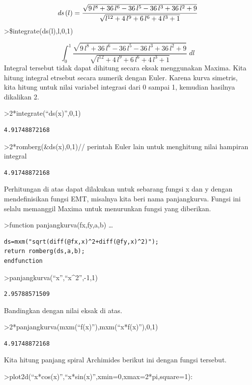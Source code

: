 \documentclass[
]{book}
\begin{document}
\[{\it ds}\left(l\right)=\frac{\sqrt{9\,l^8+36\,l^6-36\,l^5-36\,l^3+  36\,l^2+9}}{\sqrt{l^{12}+4\,l^9+6\,l^6+4\,l^3+1}}\]\textgreater\$integrate(ds(l),l,0,1)

\[\int_{0}^{1}{\frac{\sqrt{9\,l^8+36\,l^6-36\,l^5-36\,l^3+36\,l^2+9}  }{\sqrt{l^{12}+4\,l^9+6\,l^6+4\,l^3+1}}\;dl}\]Integral tersebut tidak dapat dihitung secara eksak menggunakan Maxima. Kita hitung integral etrsebut secara numerik dengan Euler. Karena kurva simetris, kita hitung untuk nilai variabel integrasi dari 0 sampai 1, kemudian hasilnya dikalikan 2.

\textgreater2*integrate(``ds(x)'',0,1)

\begin{verbatim}
4.91748872168
\end{verbatim}

\textgreater2*romberg(\&ds(x),0,1)// perintah Euler lain untuk menghitung nilai hampiran integral

\begin{verbatim}
4.91748872168
\end{verbatim}

Perhitungan di atas dapat dilakukan untuk sebarang fungsi x dan y dengan mendefinisikan fungsi EMT, misalnya kita beri nama panjangkurva. Fungsi ini selalu memanggil Maxima untuk menurunkan fungsi yang diberikan.

\textgreater function panjangkurva(fx,fy,a,b) \ldots{}

\begin{verbatim}
ds=mxm("sqrt(diff(@fx,x)^2+diff(@fy,x)^2)");
return romberg(ds,a,b);
endfunction
\end{verbatim}

\textgreater panjangkurva(``x'',``x\^{}2'',-1,1)

\begin{verbatim}
2.95788571509
\end{verbatim}

Bandingkan dengan nilai eksak di atas.

\textgreater2*panjangkurva(mxm(``f(x)''),mxm(``x*f(x)''),0,1)

\begin{verbatim}
4.91748872168
\end{verbatim}

Kita hitung panjang spiral Archimides berikut ini dengan fungsi tersebut.

\textgreater plot2d(``x*cos(x)'',``x*sin(x)'',xmin=0,xmax=2*pi,square=1):
\end{document}
